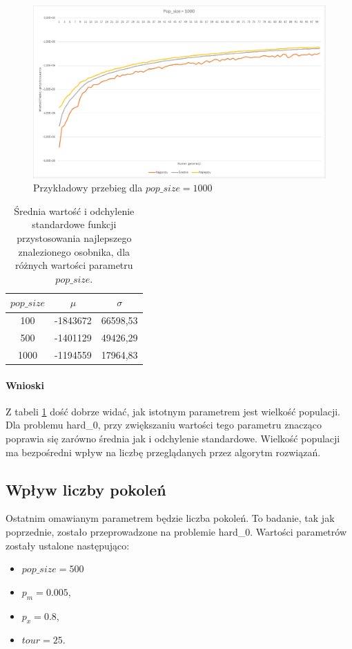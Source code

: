 \documentclass{article}
\begin{document}
	\begin{figure}[H]
		\centering
		\includegraphics[width=1\linewidth]{popsize1000.png}
		\caption{Przykładowy przebieg dla $pop\_size=1000$}
		\label{fig:pop1000}
	\end{figure}

	\begin{table}[H]
		\begin{center}
			\begin{tabular}{ |c|c|c| } 
				\hline
				$pop\_size$ & $\mu$ & $\sigma$ \\ 
				\hline
				100 & -1843672 & 66598,53 \\ 
				500 & -1401129 & 49426,29 \\ 
				1000 & -1194559 & 17964,83 \\ 
				\hline
			\end{tabular}
			\caption{Średnia wartość i odchylenie standardowe funkcji przystosowania najlepszego znalezionego osobnika, dla różnych wartości parametru $pop\_size$.}
			\label{tab:pop}
		\end{center}
	\end{table}
	
	\paragraph{Wnioski}
	Z tabeli \ref{tab:pop} dość dobrze widać, jak istotnym parametrem jest wielkość populacji. Dla problemu hard\_0, przy zwiększaniu wartości tego parametru znacząco poprawia się zarówno średnia jak i odchylenie standardowe. Wielkość populacji ma bezpośredni wpływ na liczbę przeglądanych przez algorytm rozwiązań.
	
	
	\subsection{Wpływ liczby pokoleń}
	Ostatnim omawianym parametrem będzie liczba pokoleń. To badanie, tak jak poprzednie, zostało przeprowadzone na problemie hard\_0. Wartości parametrów zostały ustalone następująco:
	\begin{itemize}
		\item $pop\_size = 500$
		\item $p_m = 0.005$,
		\item $p_x = 0.8$,
		\item $tour = 25$.
	\end{itemize}
	
\end{document}

